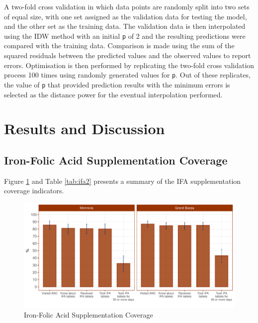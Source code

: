\documentclass[12pt,a4paper]{article}
\begin{document}
A two-fold cross validation \citep{bivand2008applied} in which data points are randomly split into two sets of equal size, with one set assigned as the validation data for testing the model, and the other set as the training data. The validation data is then interpolated using the IDW method with an initial \texttt{p} of 2 and the resulting predictions were compared with the training data. Comparison is made using the sum of the squared residuals between the predicted values and the observed values to report errors. Optimisation is then performed by replicating the two-fold cross validation process 100 times using randomly generated values for \texttt{p}. Out of these replicates, the value of \texttt{p} that provided prediction results with the minimum errors is selected as the distance power for the eventual interpolation performed.

\hypertarget{results-and-discussion}{%
\section{Results and Discussion}\label{results-and-discussion}}

\hypertarget{iron-folic-acid-supplementation-coverage}{%
\subsection{Iron-Folic Acid Supplementation Coverage}\label{iron-folic-acid-supplementation-coverage}}

Figure \ref{fig:ifa1} and Table \ref{tab:ifa2} presents a summary of the IFA supplementation coverage indicators.

\begin{figure}[H]

{\centering \includegraphics{liberiaCoverageReport_files/figure-latex/ifa1-1} 

}

\caption{Iron-Folic Acid Supplementation Coverage}\label{fig:ifa1}
\end{figure}
\end{document}
